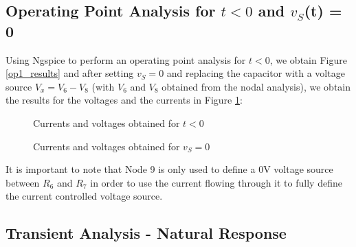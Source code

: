 \label{simulation}
\subsection{Operating Point Analysis for $t < 0$ and $v_S$(t) = 0}
\hspace{12pt} Using Ngspice to perform an operating point analysis for $t < 0$, we obtain Figure \ref{op1_results} and after setting $v_S = 0$ and replacing the capacitor with a voltage source $V_x = V_6 - V_8$ (with $V_6$ and $V_8$ obtained from the nodal analysis), we obtain the results for the voltages and the currents in Figure \ref{op2_results}:
\begin{figure}[h]
	\hspace{30pt}
	\begin{minipage}{.4\textwidth}
		\centering
			\caption{Currents and voltages obtained for $t < 0$}
			\label{op1_results}
	\end{minipage}
	\hspace{20pt}
	\begin{minipage}{.4\textwidth}
		\centering
			\caption{Currents and voltages obtained for $v_S = 0$}
			\label{op2_results}
	\end{minipage}
\end{figure}

It is important to note that Node 9 is only used to define a 0V voltage source between $R_6$ and $R_7$ in order to use the current flowing through it to fully define the current controlled voltage source.

\subsection{Transient Analysis - Natural Response}

